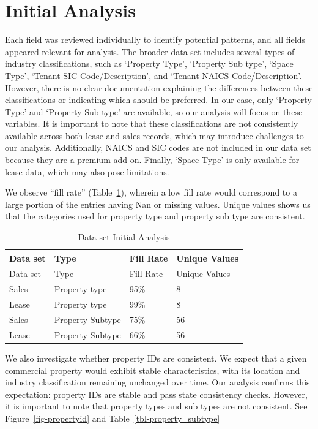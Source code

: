 \documentclass[
  12pt]{article}
\begin{document}
\section{Initial Analysis}\label{sec-intro}

Each field was reviewed individually to identify potential patterns, and
all fields appeared relevant for analysis. The broader data set includes
several types of industry classifications, such as `Property Type',
`Property Sub type', `Space Type', `Tenant SIC Code/Description', and
`Tenant NAICS Code/Description'. However, there is no clear
documentation explaining the differences between these classifications
or indicating which should be preferred. In our case, only `Property
Type' and `Property Sub type' are available, so our analysis will focus
on these variables. It is important to note that these classifications
are not consistently available across both lease and sales records,
which may introduce challenges to our analysis. Additionally, NAICS and
SIC codes are not included in our data set because they are a premium
add-on. Finally, `Space Type' is only available for lease data, which
may also pose limitations.

We observe ``fill rate'' (Table~\ref{tbl-one}), wherein a low fill rate
would correspond to a large portion of the entries having Nan or missing
values. Unique values shows us that the categories used for property
type and property sub type are consistent.

\begin{longtable}[]{@{}llll@{}}
\caption{Data set Initial Analysis}\label{tbl-one}\tabularnewline
\toprule\noalign{}
Data set & Type & Fill Rate & Unique Values \\
\midrule\noalign{}
\endfirsthead
\toprule\noalign{}
Data set & Type & Fill Rate & Unique Values \\
\midrule\noalign{}
\endhead
\bottomrule\noalign{}
\endlastfoot
Sales & Property type & 95\% & 8 \\
Lease & Property type & 99\% & 8 \\
Sales & Property Subtype & 75\% & 56 \\
Lease & Property Subtype & 66\% & 56 \\
\end{longtable}

We also investigate whether property IDs are consistent. We expect that
a given commercial property would exhibit stable characteristics, with
its location and industry classification remaining unchanged over time.
Our analysis confirms this expectation: property IDs are stable and pass
state consistency checks. However, it is important to note that property
types and sub types are not consistent. See Figure~\ref{fig-propertyid}
and Table~\ref{tbl-property_subtype}
\end{document}
